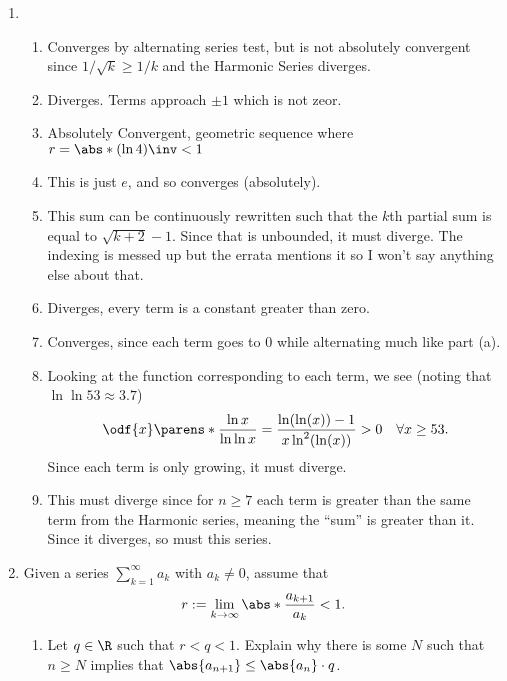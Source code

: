 \documentclass{article}
\begin{document}
\begin{enumerate}
  \item \begin{enumerate}
          \item\label{alt-1} Converges by alternating series test, but is not absolutely convergent since $1/\sqrt{k} \ge 1/k$ and the Harmonic Series diverges.
          \item Diverges. Terms approach $\pm 1$ which is not zeor.
          \item Absolutely Convergent, geometric sequence where $r = \abs*{(\ln 4)\inv} < 1$
          \item This is just $e$, and so converges (absolutely).
          \item This sum can be continuously rewritten such that the $k$th partial sum is equal to $\sqrt{k + 2} - 1$.
                Since that is unbounded, it must diverge. The indexing is messed up but the errata mentions it so I won't say anything else about that.
          \item Diverges, every term is a constant greater than zero.
          \item Converges, since each term goes to 0 while alternating much like part (a).
          \item Looking at the function corresponding to each term, we see (noting that $\ln \ln 53 \approx 3.7$)
                \[
                \odf{x}\parens*{\frac{\ln x}{\ln \ln x}} = \frac{\ln(\ln(x)) - 1}{x \ln^{2}(\ln(x))} > 0 \quad \forall x \ge 53.
                \]
                Since each term is only growing, it must diverge.
          \item This must diverge since for $n \ge 7$ each term is greater than the same term from the Harmonic series, meaning the ``sum''
                is greater than it. Since it diverges, so must this series.
        \end{enumerate}

  \item Given a series $\displaystyle \sum_{k = 1}^{\infty}a_{k}$ with $a_{k} \ne 0$, assume that
        \[ r := \lim_{k \to \infty} \abs*{\frac{a_{k + 1}}{a_{k}}} < 1. \]
        \begin{enumerate}
          \item Let $q \in \R$ such that $r < q < 1$. Explain why there is some $N$ such that $n \ge N$ implies
                that $\abs{a_{n + 1}} \le \abs{a_{n}} \cdot q$.


\end{enumerate}
\end{enumerate}
\end{document}
